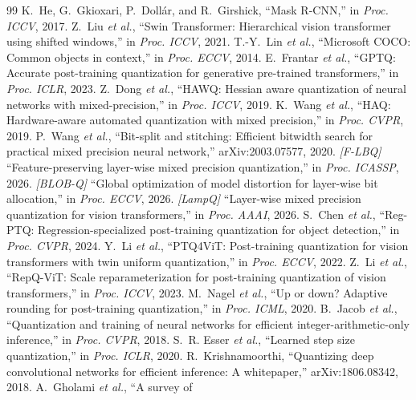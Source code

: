 \documentclass{article}
\begin{document}
\begin{thebibliography}{99}
 K.~He, G.~Gkioxari, P.~Doll\'ar, and R.~Girshick,
  ``Mask R-CNN,'' in \textit{Proc. ICCV}, 2017.
 Z.~Liu \textit{et al.}, ``Swin Transformer: Hierarchical
  vision transformer using shifted windows,'' in \textit{Proc. ICCV}, 2021.
 T.-Y.~Lin \textit{et al.}, ``Microsoft COCO: Common objects
  in context,'' in \textit{Proc. ECCV}, 2014.
 E.~Frantar \textit{et al.}, ``GPTQ: Accurate post-training
  quantization for generative pre-trained transformers,''
  in \textit{Proc. ICLR}, 2023.
 Z.~Dong \textit{et al.}, ``HAWQ: Hessian aware quantization
  of neural networks with mixed-precision,'' in \textit{Proc. ICCV}, 2019.
 K.~Wang \textit{et al.}, ``HAQ: Hardware-aware automated
  quantization with mixed precision,'' in \textit{Proc. CVPR}, 2019.
 P.~Wang \textit{et al.}, ``Bit-split and stitching:
  Efficient bitwidth search for practical mixed precision neural network,''
  arXiv:2003.07577, 2020.
 \textit{[F-LBQ]} ``Feature-preserving layer-wise mixed
  precision quantization,'' in \textit{Proc. ICASSP}, 2026.
 \textit{[BLOB-Q]} ``Global optimization of model distortion
  for layer-wise bit allocation,'' in \textit{Proc. ECCV}, 2026.
 \textit{[LampQ]} ``Layer-wise mixed precision quantization
  for vision transformers,'' in \textit{Proc. AAAI}, 2026.
 S.~Chen \textit{et al.}, ``Reg-PTQ: Regression-specialized
  post-training quantization for object detection,'' in \textit{Proc.
  CVPR}, 2024.
 Y.~Li \textit{et al.}, ``PTQ4ViT: Post-training
  quantization for vision transformers with twin uniform quantization,'' in
  \textit{Proc. ECCV}, 2022.
 Z.~Li \textit{et al.}, ``RepQ-ViT: Scale reparameterization
  for post-training quantization of vision transformers,''
  in \textit{Proc. ICCV}, 2023.
 M.~Nagel \textit{et al.}, ``Up or down? Adaptive
  rounding for post-training quantization,'' in \textit{Proc. ICML}, 2020.
 B.~Jacob \textit{et al.}, ``Quantization and
  training of neural networks for efficient integer-arithmetic-only
  inference,'' in \textit{Proc. CVPR}, 2018.
 S.~R. Esser \textit{et al.}, ``Learned step size
  quantization,'' in \textit{Proc. ICLR}, 2020.
 R.~Krishnamoorthi, ``Quantizing deep
  convolutional networks for efficient inference: A whitepaper,''
  arXiv:1806.08342, 2018.
 A.~Gholami \textit{et al.}, ``A survey of

\end{thebibliography}
\end{document}
